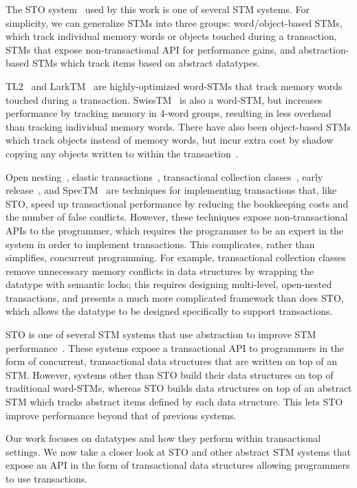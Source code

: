 The STO system~\cite{sto} used by this work is one of several STM systems. For simplicity, we can generalize STMs into three groups: word/object-based STMs, which track individual memory words or objects touched during a transaction, STMs that expose non-transactional API for performance gains, and abstraction-based STMs which track items based on abstract datatypes.

TL2~\cite{tl2} and LarkTM~\cite{larktm} are highly-optimized word-STMs that track memory words touched during a transaction. SwissTM~\cite{swisstm} is also a word-STM, but increases performance by tracking memory in 4-word groups, resulting in less overhead than tracking individual memory words. There have also been object-based STMs which track objects instead of memory words, but incur extra cost by shadow copying any objects written to within the transaction~\cite{stm_objects}. 

Open nesting~\cite{opennesting}, elastic transactions~\cite{elastic}, transactional collection classes~\cite{tcc}, early release~\cite{earlyrelease}, and SpecTM~\cite{spectm} are techniques for implementing transactions that, like STO, speed up transactional performance by reducing the bookkeeping costs and the number of false conflicts. However, these techniques expose non-transactional APIs to the programmer, which requires the programmer to be an expert in the system in order to implement transactions. This complicates, rather than simplifies, concurrent programming. For example, transactional collection classes remove unnecessary memory conflicts in data structures by wrapping the datatype with semantic locks; this requires designing multi-level, open-nested transactions, and presents a much more complicated framework than does STO, which allows the datatype to be designed specifically to support transactions.

STO is one of several STM systems that use abstraction to improve STM performance~\cite{predication}\cite{autolock}\cite{optboost}\cite{boost}. These systems expose a transactional API to programmers in the form of concurrent, transactional data structures that are written on top of an STM. However, systems other than STO build their data structures on top of traditional word-STMs, whereas STO builds data structures on top of an abstract STM which tracks abstract items defined by each data structure. This lets STO improve performance beyond that of previous systems. 

Our work focuses on datatypes and how they perform within transactional settings. We now take a closer look at STO and other abstract STM systems that expose an API in the form of transactional data structures allowing programmers to use transactions.

